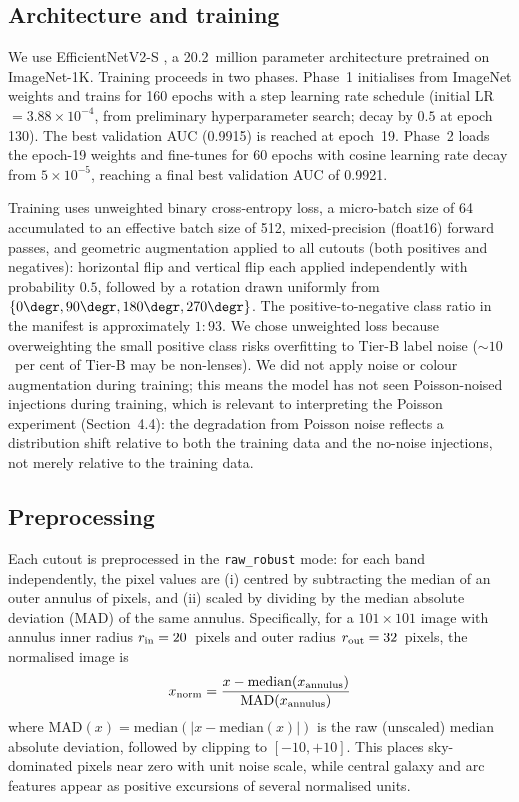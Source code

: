 \documentclass[fleqn,usenatbib]{mnras}
\begin{document}
\subsection{Architecture and training}

We use EfficientNetV2-S \citep{TanLe2021}, a 20.2~million parameter architecture pretrained on ImageNet-1K.  Training proceeds in two phases.  Phase~1 initialises from ImageNet weights and trains for 160 epochs with a step learning rate schedule (initial LR $= 3.88 \times 10^{-4}$, from preliminary hyperparameter search; decay by $0.5$ at epoch 130).  The best validation AUC (0.9915) is reached at epoch~19.  Phase~2 loads the epoch-19 weights and fine-tunes for 60 epochs with cosine learning rate decay from $5 \times 10^{-5}$, reaching a final best validation AUC of 0.9921.

Training uses unweighted binary cross-entropy loss, a micro-batch size of 64 accumulated to an effective batch size of 512, mixed-precision (float16) forward passes, and geometric augmentation applied to all cutouts (both positives and negatives): horizontal flip and vertical flip each applied independently with probability $0.5$, followed by a rotation drawn uniformly from $\{0\degr, 90\degr, 180\degr, 270\degr\}$.  The positive-to-negative class ratio in the manifest is approximately $1{:}93$.  We chose unweighted loss because overweighting the small positive class risks overfitting to Tier-B label noise ($\sim\!10$~per cent of Tier-B may be non-lenses).  We did not apply noise or colour augmentation during training; this means the model has not seen Poisson-noised injections during training, which is relevant to interpreting the Poisson experiment (Section~4.4): the degradation from Poisson noise reflects a distribution shift relative to both the training data and the no-noise injections, not merely relative to the training data.

\subsection{Preprocessing}
\label{sec:preprocessing}

Each cutout is preprocessed in the \texttt{raw\_robust} mode: for each band independently, the pixel values are (i) centred by subtracting the median of an outer annulus of pixels, and (ii) scaled by dividing by the median absolute deviation (MAD) of the same annulus.  Specifically, for a $101 \times 101$ image with annulus inner radius $r_{\rm in} = 20$~pixels and outer radius $r_{\rm out} = 32$~pixels, the normalised image is
\begin{equation}
x_{\rm norm} = \frac{x - \mathrm{median}(x_{\rm annulus})}{\mathrm{MAD}(x_{\rm annulus})}
\end{equation}
where $\mathrm{MAD}(x) = \mathrm{median}(|x - \mathrm{median}(x)|)$ is the raw (unscaled) median absolute deviation, followed by clipping to $[-10, +10]$.  This places sky-dominated pixels near zero with unit noise scale, while central galaxy and arc features appear as positive excursions of several normalised units.
\end{document}
